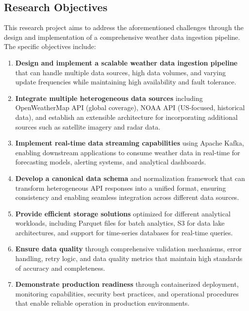 \documentclass[12pt,a4paper]{article}
\begin{document}
\subsection{Research Objectives}

This research project aims to address the aforementioned challenges through the design and implementation of a comprehensive weather data ingestion pipeline. The specific objectives include:

\begin{enumerate}
    \item \textbf{Design and implement a scalable weather data ingestion pipeline} that can handle multiple data sources, high data volumes, and varying update frequencies while maintaining high availability and fault tolerance.
    
    \item \textbf{Integrate multiple heterogeneous data sources} including OpenWeatherMap API (global coverage), NOAA API (US-focused, historical data), and establish an extensible architecture for incorporating additional sources such as satellite imagery and radar data.
    
    \item \textbf{Implement real-time data streaming capabilities} using Apache Kafka, enabling downstream applications to consume weather data in real-time for forecasting models, alerting systems, and analytical dashboards.
    
    \item \textbf{Develop a canonical data schema} and normalization framework that can transform heterogeneous API responses into a unified format, ensuring consistency and enabling seamless integration across different data sources.
    
    \item \textbf{Provide efficient storage solutions} optimized for different analytical workloads, including Parquet files for batch analytics, S3 for data lake architectures, and support for time-series databases for real-time queries.
    
    \item \textbf{Ensure data quality} through comprehensive validation mechanisms, error handling, retry logic, and data quality metrics that maintain high standards of accuracy and completeness.
    
    \item \textbf{Demonstrate production readiness} through containerized deployment, monitoring capabilities, security best practices, and operational procedures that enable reliable operation in production environments.
\end{enumerate}
\end{document}
